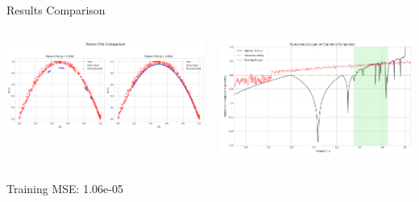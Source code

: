 \documentclass{beamer}
\begin{document}
\begin{frame}{Results Comparison}
  \begin{columns}
    \includegraphics[width=\textwidth]{figures/bd_return_plot_2.png}
    
    \includegraphics[width=\textwidth]{figures/lyapanov_bd_rd.png}
  \end{columns}
  \begin{center}
    Training MSE: 1.06e-05
  \end{center}
\end{frame}
\end{document}
